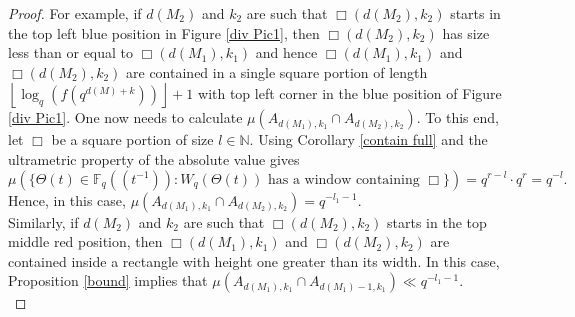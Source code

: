 \documentclass{article}
\theoremstyle{definition}
\newcommand{\N}{\mathbb{N}}
\newcommand{\F}{\mathbb{F}}
\numberwithin{equation}{subsection}
\begin{document}
\begin{proof}
\noindent For example, if $d(M_2)$ and $k_2$ are such that $\Box(d(M_2),k_2)$ starts in the top left blue position in Figure \ref{div Pic1}, then $\Box(d(M_2),k_2)$ has size less than or equal to $\Box(d(M_1),k_1)$ and hence $\Box(d(M_1),k_1)$ and $\Box(d(M_2),k_2)$ are contained in a single square portion of length $\left\lfloor\log_q(f(q^{d(M)+k}))\right\rfloor+1$ with top left corner in the blue position of Figure \ref{div Pic1}. One now needs to calculate $\mu(A_{d(M_1),k_1}\cap A_{d(M_2),k_2})$. To this end, let $\Box$ be a square portion of size $l\in\N$. Using Corollary \ref{contain full} and the ultrametric property of the absolute value gives \[\mu(\{\Theta(t)\in\F_q\!\left(\!\left(t^{-1}\right)\!\right): W_q(\Theta(t))\text{ has a window containing }\Box\})=q^{r-l}\cdot q^r=q^{-l}.\] \noindent Hence, in this case, $\mu(A_{d(M_1),k_1}\cap A_{d(M_2),k_2})=q^{-l_1-1}.$\\

\noindent Similarly, if $d(M_2)$ and $k_2$ are such that $\Box(d(M_2),k_2)$ starts in the top middle red position, then $\Box(d(M_1),k_1)$ and $\Box(d(M_2),k_2)$ are contained inside a rectangle with height one greater than its width. In this case, Proposition \ref{bound} implies that
$\mu(A_{d(M_1),k_1}\cap A_{d(M_1)-1,k_1})\ll q^{-l_1-1}.$ \\


\end{proof}
\end{document}
